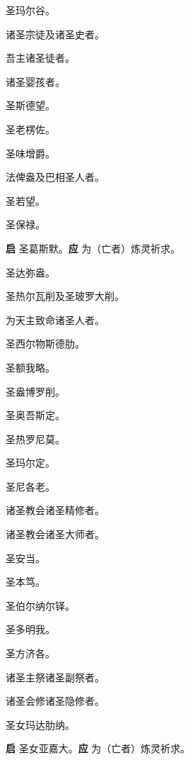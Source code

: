 \documentclass[UTF8,17pt]{ctexart}
\begin{document}
 圣玛尔⾕。

 诸圣宗徒及诸圣史者。

 吾主诸圣徒者。

 诸圣婴孩者。

 圣斯德望。

 圣⽼楞佐。

 圣味增爵。

 法俾盎及巴相圣⼈者。

 圣若望。

 圣保禄。

\textbf{启} \quad 圣葛斯默。\hfill \textbf{应} \quad 为（亡者）炼灵祈求。

 圣达弥盎。

 圣热尔⽡削及圣玻罗⼤削。

 为天主致命诸圣⼈者。

 圣西尔物斯德肋。

 圣额我略。

 圣盎博罗削。

 圣奥吾斯定。

 圣热罗尼莫。

 圣玛尔定。

 圣尼各⽼。

 诸圣教会诸圣精修者。

 诸圣教会诸圣⼤师者。

 圣安当。

 圣本笃。

 圣伯尔纳尔铎。

 圣多明我。

 圣⽅济各。

 诸圣主祭诸圣副祭者。

 诸圣会修诸圣隐修者。

 圣⼥玛达肋纳。

\textbf{启} \quad 圣⼥亚嘉⼤。\hfill \textbf{应} \quad 为（亡者）炼灵祈求。
\end{document}
